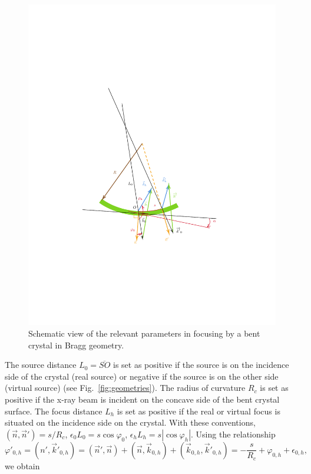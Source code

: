 \documentclass[preprint]{iucr}              %
\begin{document}
\begin{figure}
\label{fig:vectors}
\caption{Schematic view of the relevant parameters in focusing by a bent crystal in Bragg geometry.
}
\includegraphics[width=0.99\textwidth,trim=4cm 6cm 5cm 10cm,clip=true]{fig2.pdf}
\end{figure}

The source distance $L_0=\overline{SO}$ is set as positive if the source is on the incidence side of the crystal (real source) or negative if the source is on the other side (virtual source) (see Fig.~\ref{fig:geometries}). The radius of curvature $R_c$ is set as positive if the x-ray beam is incident on the concave side of the bent crystal surface. The focus distance $L_h$ is set as positive if the real or virtual focus is situated on the incidence side on the crystal. With these conventions, $(\vec n,\vec n')=s/R_c$, $\epsilon_0 L_0 = s \cos\varphi_0$,  $\epsilon_h L_h = s |\cos\varphi_h|$. Using the relationship
\begin{equation}
    \varphi'_{0,h} = 
    (n',  \vec k'_{0,h}) = 
    (\vec n', \vec n) + (\vec n,\vec k_{0,h}) + (\vec k_{0,h}, \vec k'_{0,h}) = -\frac{s}{R_c} + \varphi_{0,h} + \epsilon_{0,h},
\end{equation}
we obtain
\end{document}

